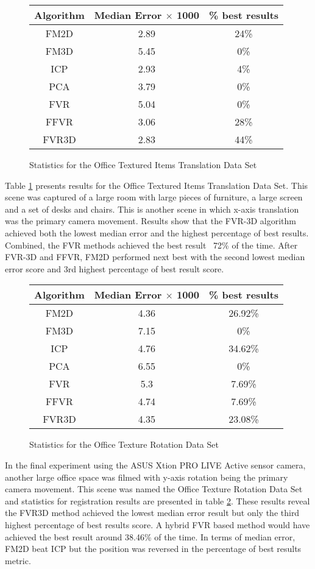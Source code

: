 \begin{figure}
\centering
\begin{tabular}{ccc}
\hline
\textbf{Algorithm} & \textbf{Median Error $\times$ 1000} & \textbf{\% best results}\\ \hline
FM2D	& 2.89 & 24\%\\
FM3D	& 5.45 & 0\%\\
ICP	& 2.93 & 4\%\\
PCA	& 3.79 & 0\%\\
FVR	& 5.04 & 0\%\\
FFVR	& 3.06 & 28\%\\
FVR3D	& 2.83 & 44\%\\
\end{tabular}
\caption{Statistics for the Office Textured Items Translation Data Set}
\label{tab:officetextureditemstranslation}
\end{figure} 

Table \ref{tab:officetextureditemstranslation} presents results for the Office Textured Items Translation Data Set. This scene was captured of a large room with large pieces of furniture, a large screen and a set of desks and chairs. This is another scene in which x-axis translation was the primary camera movement. Results show that the FVR-3D algorithm achieved both the lowest median error and the highest percentage of best results. Combined, the FVR methods achieved the best result ~72\% of the time. After FVR-3D and FFVR, FM2D performed next best with the second lowest median error score and 3rd highest percentage of best result score. \\

\begin{figure}
\centering
\begin{tabular}{ccc}
\hline
\textbf{Algorithm} & \textbf{Median Error $\times$ 1000} & \textbf{\% best results}\\ \hline
FM2D	& 4.36 & 26.92\%\\
FM3D	& 7.15 & 0\%\\
ICP	& 4.76 & 34.62\%\\
PCA	& 6.55 & 0\%\\
FVR	& 5.3 & 7.69\%\\
FFVR	& 4.74 & 7.69\%\\
FVR3D	& 4.35 & 23.08\%\\
\end{tabular}
\caption{Statistics for the Office Texture Rotation Data Set}
\label{tab:officetexturerotation}
\end{figure} 

In the final experiment using the ASUS Xtion PRO LIVE Active sensor camera, another large office space was filmed with y-axis rotation being the primary camera movement. This scene was named the Office Texture Rotation Data Set and statistics for registration results are presented in table \ref{tab:officetexturerotation}. These results reveal the FVR3D method achieved the lowest median error result but only the third highest percentage of best results score. A hybrid FVR based method would have achieved the best result around 38.46\% of the time. In terms of median error, FM2D beat ICP but the position was reversed in the percentage of best results metric. 

